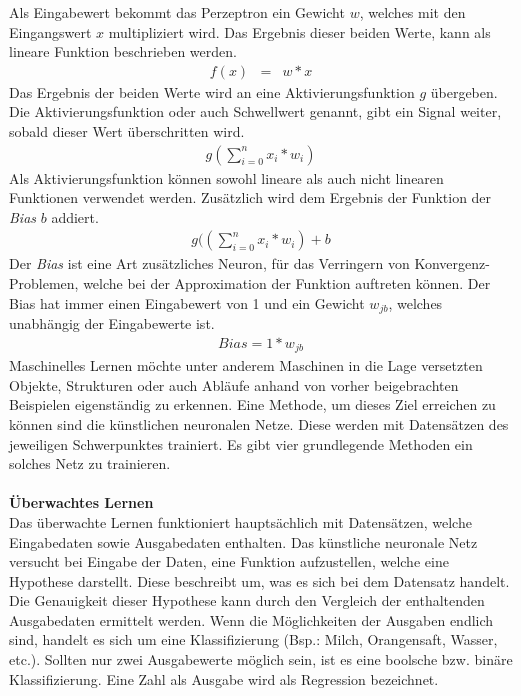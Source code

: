 Als Eingabewert bekommt das Perzeptron ein Gewicht $w$, welches mit den Eingangswert $x$ multipliziert wird. Das Ergebnis dieser beiden Werte, kann als lineare Funktion beschrieben werden.
\begin{eqnarray} f(x) & = & w*x \end{eqnarray}
Das Ergebnis der beiden Werte wird an eine Aktivierungsfunktion $g$ übergeben. Die Aktivierungsfunktion oder auch Schwellwert genannt, gibt ein Signal weiter, sobald dieser Wert überschritten wird.
\begin{eqnarray} g( \sum_{i=0}^n x_{i} *w_{i}) \end{eqnarray}
Als Aktivierungsfunktion können sowohl lineare als auch nicht linearen Funktionen verwendet werden. Zusätzlich wird dem Ergebnis der Funktion der \textit{Bias} $b$ addiert.
\begin{eqnarray} g(( \sum_{i=0}^n x_{i} *w_{i}) +b \end{eqnarray}
Der \textit{Bias} ist eine Art zusätzliches Neuron, für das Verringern von Konvergenz-Problemen, welche bei der Approximation der Funktion auftreten können. Der Bias hat immer einen Eingabewert von 1 und ein Gewicht $w_{jb}$, welches unabhängig der Eingabewerte ist.
\begin{eqnarray} Bias = 1*w_{jb} \end{eqnarray}
Maschinelles Lernen möchte unter anderem Maschinen in die Lage versetzten Objekte, Strukturen oder auch Abläufe anhand von vorher beigebrachten Beispielen eigenständig zu erkennen. Eine Methode, um dieses Ziel erreichen zu können sind die künstlichen neuronalen Netze. Diese werden mit Datensätzen des jeweiligen Schwerpunktes trainiert. Es gibt vier grundlegende Methoden ein solches Netz zu trainieren.\\\\
\textbf{Überwachtes Lernen}\\
Das überwachte Lernen funktioniert hauptsächlich mit Datensätzen, welche Eingabedaten sowie Ausgabedaten enthalten. Das künstliche neuronale Netz versucht bei Eingabe der Daten, eine Funktion aufzustellen, welche eine Hypothese darstellt. Diese beschreibt um, was es sich bei dem Datensatz handelt. Die Genauigkeit dieser Hypothese kann durch den Vergleich der enthaltenden Ausgabedaten ermittelt werden. Wenn die Möglichkeiten der Ausgaben endlich sind, handelt es sich um eine Klassifizierung (Bsp.: Milch, Orangensaft, Wasser, etc.). Sollten nur zwei Ausgabewerte möglich sein, ist es eine boolsche bzw. binäre Klassifizierung. Eine Zahl als Ausgabe wird als Regression bezeichnet.\\\\
